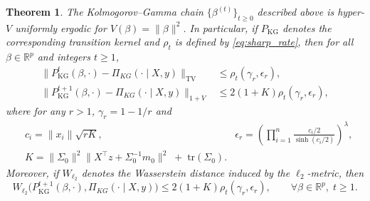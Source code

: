 \documentclass[ejsv2, noshowframe]{imsart}
\theoremstyle{plain}
\newtheorem{theorem}{Theorem}[section]
\theoremstyle{definition}
\theoremstyle{remark}
\newcommand{\e}{\epsilon}
\newcommand{\tr}{\text{tr}}
\newcommand{\R}{\mathbb{R}}
\begin{document}
\begin{theorem} \label{thm:kg_convergence}
The Kolmogorov--Gamma chain $\{\beta^{(t)}\}_{t\ge 0}$ described above is hyper-$V$ uniformly ergodic for $V(\beta) = \|\beta\|^2$. In particular, if $P_{\mathrm{KG}}$ denotes the corresponding transition kernel and $\rho_{t}$ is defined by \eqref{eq:sharp_rate}, then for all $\beta \in \R^p$ and integers $t \ge 1$,
\begin{align*}
\| P_{\mathrm{KG}}^{t}(\beta,\cdot) - \Pi_{KG}(\cdot \mid X, y) \|_{\mathrm{TV}}
&\le \rho_{t}(\gamma_r, \e_r), \\
\| P_{\mathrm{KG}}^{t + 1}(\beta,\cdot) - \Pi_{KG}(\cdot \mid X, y) \|_{1 + V}
&\le 2 (1 + K) \rho_{t}(\gamma_r, \e_r),
\end{align*}
where for any $r > 1$, $\gamma_r = 1 - 1/r$ and
\begin{align*}
&c_i = \|x_i\| \sqrt{r K},
&\epsilon_r = \left( \prod_{i=1}^n \frac{c_i/2}{\sinh(c_i/2)} \right)^\lambda,
\\
&K = \|\Sigma_0\|^2 \|X^\top z + \Sigma_0^{-1} m_0\|^2
\;+\; \tr(\Sigma_0).
\end{align*}
Moreover, if $W_{ \ell_2 }$ denotes the Wasserstein distance induced by the $\ell_2$-metric, then
\[
W_{ \ell_2 }\big(P_{\mathrm{KG}}^{t+1}(\beta,\cdot), \Pi_{KG}(\cdot \mid X, y) \big)
\le 2 ( 1 + K ) \rho_{t}(\gamma_r, \e_r),
\qquad \forall \beta \in \R^p,\; t \ge 1.
\]
\end{theorem}
\end{document}
